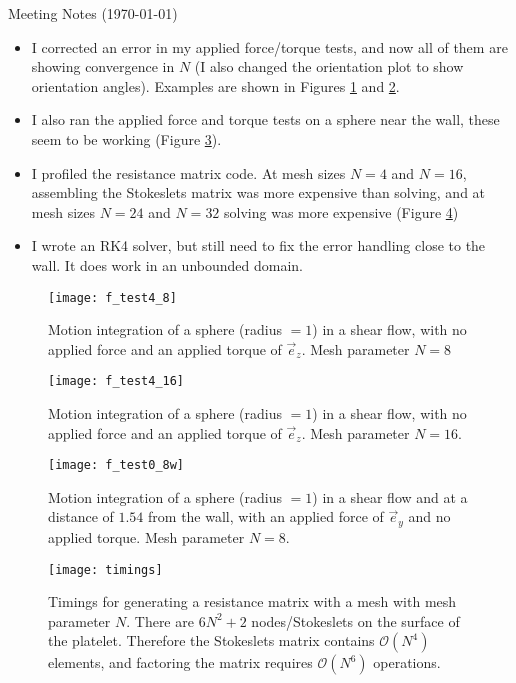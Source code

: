 \documentclass{article}
\begin{document}
\pagestyle{plain}

\begin{center}
  {\Large Meeting Notes (\today)}
\end{center}

\begin{itemize}
\item I corrected an error in my applied force/torque tests, and now
  all of them are showing convergence in $N$ (I also changed the
  orientation plot to show orientation angles). Examples are shown in
  Figures \ref{fig:f48_plot} and \ref{fig:f416_plot}.
\item I also ran the applied force and torque tests on a sphere near
  the wall, these seem to be working (Figure \ref{fig:f08w_plot}).
\item I profiled the resistance matrix code. At mesh sizes $N = 4$ and
  $N = 16$, assembling the Stokeslets matrix was more expensive than
  solving, and at mesh sizes $N = 24$ and $N = 32$ solving was more
  expensive (Figure \ref{fig:timings_plot})
\item I wrote an RK4 solver, but still need to fix the error handling
  close to the wall. It does work in an unbounded domain.
\end{itemize}

\begin{figure}
  \centering
  \texttt{[image: f\_test4\_8]}
  \caption{Motion integration of a sphere (radius $=1$) in a shear
    flow, with no applied force and an applied torque of
    $\vec{e}_z$. Mesh parameter $N = 8$}
  \label{fig:f48_plot}
\end{figure}

\begin{figure}
  \centering
  \texttt{[image: f\_test4\_16]}
  \caption{Motion integration of a sphere (radius $=1$) in a shear
    flow, with no applied force and an applied torque of
    $\vec{e}_z$. Mesh parameter $N = 16$.}
  \label{fig:f416_plot}
\end{figure}

\begin{figure}
  \centering
  \texttt{[image: f\_test0\_8w]}
  \caption{Motion integration of a sphere (radius $=1$) in a shear
    flow and at a distance of $1.54$ from the wall, with an applied
    force of $\vec{e}_y$ and no applied torque. Mesh parameter $N =
    8$.}
  \label{fig:f08w_plot}
\end{figure}

\begin{figure}
  \centering
  \texttt{[image: timings]}
  \caption{Timings for generating a resistance matrix with a mesh with
    mesh parameter $N$. There are $6N^2 + 2$ nodes/Stokeslets on the surface of
    the platelet. Therefore the Stokeslets matrix contains
    $\mathcal{O}(N^4)$ elements, and factoring the matrix requires
    $\mathcal{O}(N^6)$ operations.}
  \label{fig:timings_plot}
\end{figure}
\end{document}
